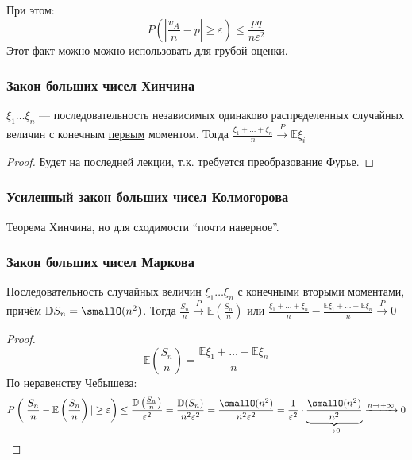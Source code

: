 При этом:
\[P\left( \left|\frac{v_A}{n} - p\right| \geq \varepsilon \right) \leq \frac{pq}{n\varepsilon^2}\]
Этот факт можно можно использовать для грубой оценки.

\subsubsection{Закон больших чисел Хинчина}

\begin{theorem}
    \(\xi_1 \dots \xi_n\) --- последовательность независимых одинаково распределенных случайных величин с конечным \underline{первым} моментом. Тогда \(\frac{\xi_1 + \dots + \xi_n}{n} \xrightarrow{P} \mathbb{E}\xi_i\)
\end{theorem}
\begin{proof}
    Будет на последней лекции, т.к. требуется преобразование Фурье.
\end{proof}

\subsubsection{Усиленный закон больших чисел Колмогорова}

Теорема Хинчина, но для сходимости ``почти наверное''.

\subsubsection{Закон больших чисел Маркова}

\begin{theorem}
    Последовательность случайных величин \(\xi_1 \dots \xi_n\) с конечными вторыми моментами, причём \(\mathbb{D}S_n = \smallO(n^2)\). Тогда \(\frac{S_n}{n} \xrightarrow{P} \mathbb{E}\left( \frac{S_n}{n} \right)\) или \(\frac{\xi_1 + \dots + \xi_n}{n} - \frac{\mathbb{E}\xi_1 + \dots + \mathbb{E}\xi_n}{n} \xrightarrow{P} 0 \)
\end{theorem}
\begin{proof}
    \[\mathbb{E}\left( \frac{S_n}{n} \right) = \frac{\mathbb{E} \xi_1 + \dots + \mathbb{E} \xi_n}{n}\]
    По неравенству Чебышева:
    \[P\left( |\frac{S_n}{n} - \mathbb{E}\left( \frac{S_n}{n} \right)| \geq \varepsilon \right) \leq \frac{\mathbb{D}\left( \frac{S_n}{n} \right)}{\varepsilon^2} = \frac{\mathbb{D}(S_n)}{n^2 \varepsilon^2} = \frac{\smallO(n^2)}{n^2 \varepsilon^2} = \frac{1}{\varepsilon^2} \cdot \underbrace{\frac{\smallO(n^2)}{n^2}}_{ \to 0} \xrightarrow{n \to +\infty} 0\]
\end{proof}

